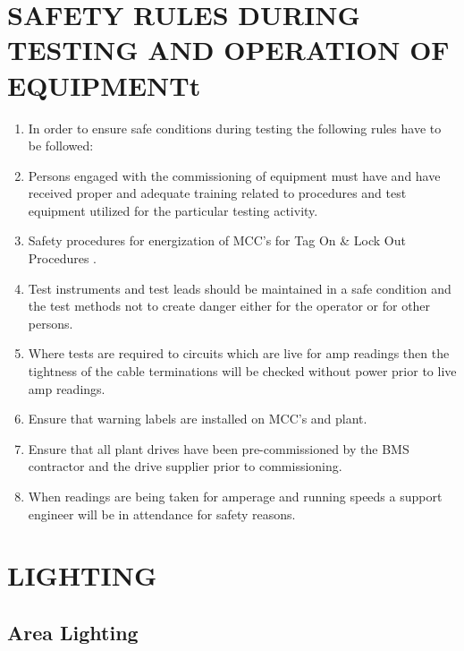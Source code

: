 \section{SAFETY RULES DURING TESTING AND OPERATION OF EQUIPMENTt}
\begin{enumerate}
\item	In order to ensure safe conditions during testing the following rules have to be followed:
\item	Persons engaged with the commissioning of equipment must have  and have received proper and adequate training related to procedures and test equipment utilized for the particular testing activity.  
\item	Safety procedures for energization of MCC’s for Tag On \& Lock Out Procedures .
\item	Test instruments and test leads should be maintained in a safe condition and the test methods not to create danger either for the operator or for other persons.
\item	Where tests are required to circuits which are live for amp readings then the tightness of the cable terminations will be checked without power prior to live amp readings.
        \item     Ensure that warning labels are installed on MCC’s and plant.
	\item     Ensure that all plant drives have been pre-commissioned by the BMS contractor 
 and the drive supplier prior to commissioning.
\item	When readings are being taken for amperage and running speeds a support engineer    will be in attendance for safety reasons.
\end{enumerate}


\section{LIGHTING}
\subsection{Area Lighting}

